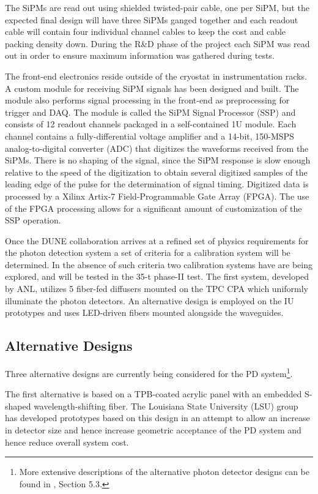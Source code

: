 The SiPMs are read out using shielded twisted-pair cable, one per SiPM,
but the expected final design will have three SiPMs ganged together and
each readout cable will contain four individual channel cables to keep
the cost and cable packing density down. During the R\&D phase of the
project each SiPM was read out in order to ensure maximum information
was gathered during tests.  

The front-end electronics reside outside of the cryostat in
instrumentation racks. A custom module for receiving SiPM signals has
been designed and built. The module also performs signal processing in
the front-end as preprocessing for trigger and DAQ.  The module is
called the SiPM Signal Processor (SSP) and consists of 12 readout
channels packaged in a self-contained 1U module.  Each channel
contains a fully-differential voltage amplifier and a 14-bit, 150-MSPS
analog-to-digital converter (ADC) that digitizes the waveforms
received from the SiPMs. There is no shaping of the signal, since the
SiPM response is slow enough relative to the speed of the digitization
to obtain several digitized samples of the leading edge of the pulse
for the determination of signal timing. Digitized data is processed by
a Xilinx Artix-7 Field-Programmable Gate Array (FPGA).  The use of the
FPGA processing allows for a significant amount of customization of
the SSP operation. 

Once the DUNE collaboration arrives at a refined set of physics
requirements for the photon detection system a set of criteria for a
calibration system will be determined. In the absence of such criteria
two calibration systems have are being explored, and will be tested in
the 35-t phase-II test. The first system, developed by ANL, utilizes 5
fiber-fed diffusers mounted on the TPC CPA which uniformly illuminate
the photon detectors. An alternative design is employed on the IU
prototypes and uses LED-driven fibers mounted alongside the
waveguides. 

\subsection{Alternative Designs} 

Three alternative designs are currently being considered for the PD
system\footnote{More extensive descriptions of the alternative photon
  detector designs can be found in \anxlbnefd, Section 5.3.}.

The first alternative is based on a TPB-coated acrylic panel with an
embedded S-shaped wavelength-shifting fiber. The Louisiana State
University (LSU) group has developed prototypes based on this design
in an attempt to allow an increase in detector size and hence increase
geometric acceptance of the PD system and hence reduce overall system
cost.

